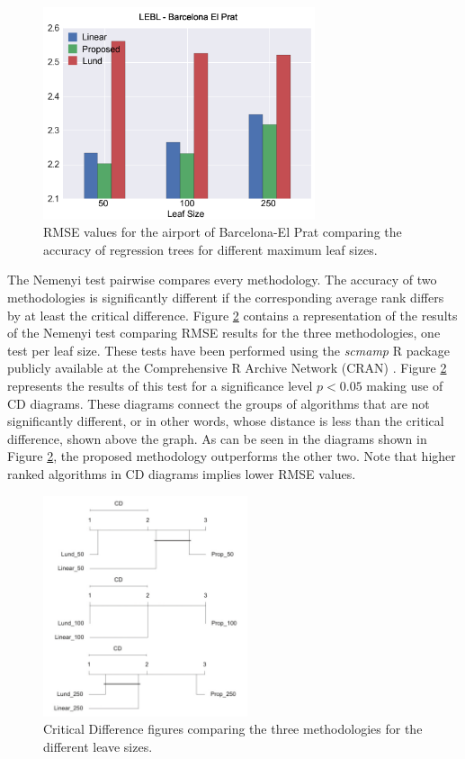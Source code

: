 \documentclass[times,twocolumn,final,authoryear]{elsarticle}
\begin{document}
\begin{figure}
  \includegraphics[width=8cm]{barcelona.png}
\caption{RMSE values for the airport of Barcelona-El Prat comparing the accuracy of regression trees for different maximum leaf sizes.}
\label{f6}
\end{figure}

The Nemenyi test pairwise compares every methodology. The accuracy of two methodologies is significantly different if the corresponding average rank differs by at least the critical difference. Figure \ref{f7} contains a representation of the results of the Nemenyi test comparing RMSE results for the three methodologies, one test per leaf size. These tests have been performed using the \textit{scmamp} R package publicly available at the Comprehensive R Archive Network (CRAN) \citep{Calvo2015}. Figure \ref{f7} represents the results of this test for a significance level $ p < 0.05 $ making use of CD diagrams.  These diagrams connect the groups of algorithms that are not significantly different, or in other words, whose distance is less than the critical difference, shown above the graph. As can be seen in the diagrams shown in Figure \ref{f7}, the proposed methodology outperforms the other two. Note that higher ranked algorithms in CD diagrams implies lower RMSE values.

\begin{figure}
\centering
\parbox{5cm}{
\includegraphics[width=6cm]{CD.pdf}}
\qquad
\caption{Critical Difference figures comparing the three methodologies for the different leave sizes.}
\label{f7}
\end{figure}
\end{document}

